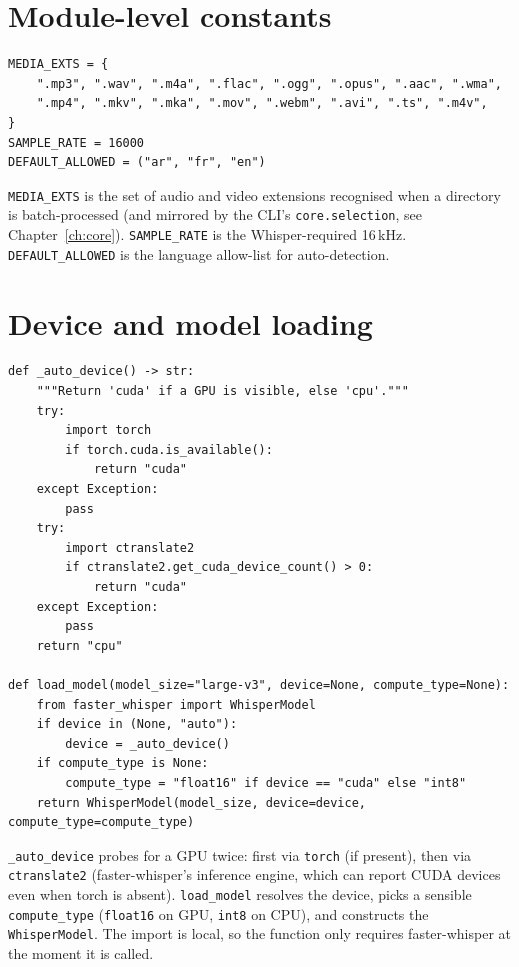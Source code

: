 \documentclass[11pt,a4paper]{report}
\newcommand{\code}[1]{\texttt{\small #1}}
\begin{document}
\section{Module-level constants}

\begin{lstlisting}[caption={Constants in \texttt{transcribe.py}.}]
MEDIA_EXTS = {
    ".mp3", ".wav", ".m4a", ".flac", ".ogg", ".opus", ".aac", ".wma",
    ".mp4", ".mkv", ".mka", ".mov", ".webm", ".avi", ".ts", ".m4v",
}
SAMPLE_RATE = 16000
DEFAULT_ALLOWED = ("ar", "fr", "en")
\end{lstlisting}

\code{MEDIA\_EXTS} is the set of audio and video extensions recognised when a
directory is batch-processed (and mirrored by the CLI's \code{core.selection},
see Chapter~\ref{ch:core}). \code{SAMPLE\_RATE} is the Whisper-required 16\,kHz.
\code{DEFAULT\_ALLOWED} is the language allow-list for auto-detection.

\section{Device and model loading}

\begin{lstlisting}[caption={Device probe and model loader.}]
def _auto_device() -> str:
    """Return 'cuda' if a GPU is visible, else 'cpu'."""
    try:
        import torch
        if torch.cuda.is_available():
            return "cuda"
    except Exception:
        pass
    try:
        import ctranslate2
        if ctranslate2.get_cuda_device_count() > 0:
            return "cuda"
    except Exception:
        pass
    return "cpu"

def load_model(model_size="large-v3", device=None, compute_type=None):
    from faster_whisper import WhisperModel
    if device in (None, "auto"):
        device = _auto_device()
    if compute_type is None:
        compute_type = "float16" if device == "cuda" else "int8"
    return WhisperModel(model_size, device=device, compute_type=compute_type)
\end{lstlisting}

\code{\_auto\_device} probes for a GPU twice: first via \code{torch} (if present),
then via \code{ctranslate2} (faster-whisper's inference engine, which can report
CUDA devices even when torch is absent). \code{load\_model} resolves the device,
picks a sensible \code{compute\_type} (\code{float16} on GPU, \code{int8} on CPU),
and constructs the \code{WhisperModel}. The import is local, so the function only
requires faster-whisper at the moment it is called.
\end{document}
